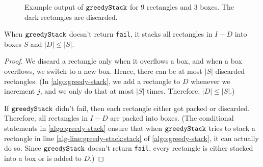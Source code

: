 \begin{figure}[htb]
\centering

\caption[Example output of $\greedyStack$ for 9 rectangles and 3 boxes.]%
{Example output of $\greedyStack$ for 9 rectangles and 3 boxes.
The dark rectangles are discarded.}
\label{fig:greedy-stack-output}
\end{figure}

\begin{lemma}
\label{lem:greedy-stack-basic}
When $\greedyStack$ doesn't return \texttt{fail}, it stacks all rectangles in $I-D$
into boxes $S$ and $|D| \le |S|$.
\end{lemma}
\begin{proof}
We discard a rectangle only when it overflows a box,
and when a box overflows, we switch to a new box.
Hence, there can be at most $|S|$ discarded rectangles.
(In \cref{algo:greedy-stack}, we add a rectangle to $D$ whenever
we increment $j$, and we only do that at most $|S|$ times. Therefore, $|D| \le |S|$.)

If $\greedyStack$ didn't fail, then each rectangle either got packed or discarded.
Therefore, all rectangles in $I-D$ are packed into boxes.
(The conditional statements in \cref{algo:greedy-stack} ensure that when $\greedyStack$ tries to
stack a rectangle in line \ref{alg-line:greedy-stack:stack} of \cref{algo:greedy-stack},
it can actually do so. Since $\greedyStack$ doesn't return \texttt{fail},
every rectangle is either stacked into a box or is added to $D$.)
\end{proof}

